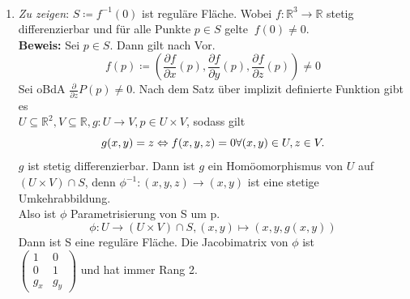 \begin{solution}
  \
  \begin{enumerate}[label= (\alph*)] 
    \item \emph{Zu zeigen}: \( S \coloneqq f^{-1}(0) \) ist reguläre Fläche. Wobei \( f: \mathbb{R}^3 \to \mathbb{R} \) stetig differenzierbar und für alle Punkte \( p \in S \) gelte \( \ f(0) \neq 0 \). \\
    \textbf{Beweis:} Sei \( p \in S \). Dann gilt nach Vor.
    \begin{equation*}
      f(p) \coloneqq \left(\frac{\partial f}{\partial x}(p), 
      \frac{\partial f}{\partial y}(p), 
      \frac{\partial f}{\partial z}(p) \right) \neq 0
    \end{equation*}
    Sei oBdA \( \frac{\partial}{\partial z} P(p) \neq 0 \). Nach dem Satz über implizit definierte Funktion gibt es\\
    \( U \subseteq \mathbb{R}^2, V \subseteq \mathbb{R}, g: U \to V, p \in U \times V \), sodass gilt\\
    \begin{equation*}
      g(x,y) = z \Leftrightarrow f(x,y,z) = 0 \hfill \forall (x,y) \in U, z \in V. \\
    \end{equation*}
    \( g \) ist stetig differenzierbar. Dann ist \( g \) ein Homöomorphismus von \( U \) auf \( (U \times V) \cap S \), denn \( \phi^{-1}:(x,y,z) \to (x,y) \) ist eine stetige Umkehrabbildung. \\
    Also ist \( \phi \) Parametrisierung von S um p.
    \begin{equation*}
      \phi: U \to (U \times V) \cap S, (x,y) \mapsto (x,y,g(x,y))
    \end{equation*}
    Dann ist S eine reguläre Fläche.
    Die Jacobimatrix von \( \phi \) ist\\ 
    \( \begin{pmatrix}
      1 & 0 \\
      0 & 1 \\
      g_x & g_y
    \end{pmatrix} \) und hat immer Rang 2.
    

\end{enumerate}
\end{solution}
